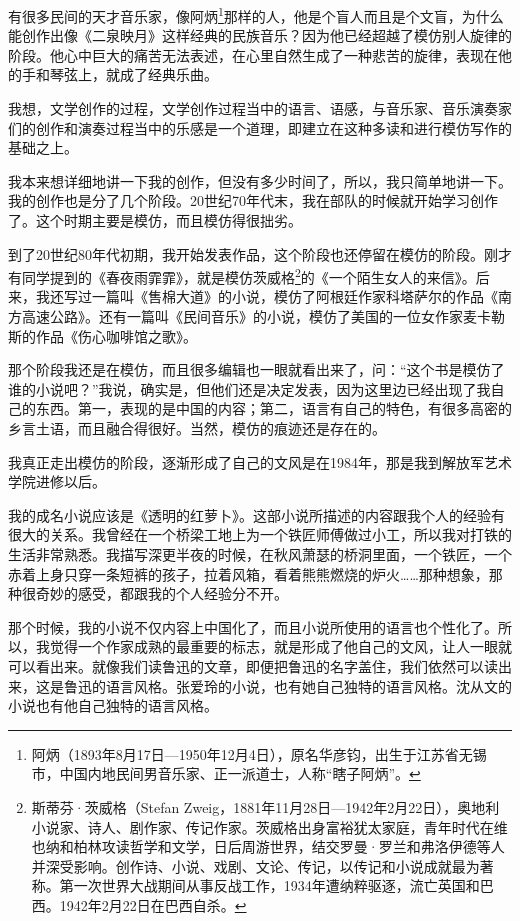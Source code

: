 \documentclass[fontset=fandol,12pt,a5paper]{ctexbook}
\begin{document}
有很多民间的天才音乐家，像阿炳\footnote{阿炳（1893年8月17日—1950年12月4日），原名华彦钧，出生于江苏省无锡市，中国内地民间男音乐家、正一派道士，人称“瞎子阿炳”。}那样的人，他是个盲人而且是个文盲，为什么能创作出像《二泉映月》这样经典的民族音乐？因为他已经超越了模仿别人旋律的阶段。他心中巨大的痛苦无法表述，在心里自然生成了一种悲苦的旋律，表现在他的手和琴弦上，就成了经典乐曲。

我想，文学创作的过程，文学创作过程当中的语言、语感，与音乐家、音乐演奏家们的创作和演奏过程当中的乐感是一个道理，即建立在这种多读和进行模仿写作的基础之上。

我本来想详细地讲一下我的创作，但没有多少时间了，所以，我只简单地讲一下。我的创作也是分了几个阶段。20世纪70年代末，我在部队的时候就开始学习创作了。这个时期主要是模仿，而且模仿得很拙劣。

到了20世纪80年代初期，我开始发表作品，这个阶段也还停留在模仿的阶段。刚才有同学提到的《春夜雨霏霏》，就是模仿茨威格\footnote{斯蒂芬·茨威格（Stefan Zweig，1881年11月28日—1942年2月22日），奥地利小说家、诗人、剧作家、传记作家。茨威格出身富裕犹太家庭，青年时代在维也纳和柏林攻读哲学和文学，日后周游世界，结交罗曼·罗兰和弗洛伊德等人并深受影响。创作诗、小说、戏剧、文论、传记，以传记和小说成就最为著称。第一次世界大战期间从事反战工作，1934年遭纳粹驱逐，流亡英国和巴西。1942年2月22日在巴西自杀。}的《一个陌生女人的来信》。后来，我还写过一篇叫《售棉大道》的小说，模仿了阿根廷作家科塔萨尔的作品《南方高速公路》。还有一篇叫《民间音乐》的小说，模仿了美国的一位女作家麦卡勒斯的作品《伤心咖啡馆之歌》。

那个阶段我还是在模仿，而且很多编辑也一眼就看出来了，问：“这个书是模仿了谁的小说吧？”我说，确实是，但他们还是决定发表，因为这里边已经出现了我自己的东西。第一，表现的是中国的内容；第二，语言有自己的特色，有很多高密的乡言土语，而且融合得很好。当然，模仿的痕迹还是存在的。

我真正走出模仿的阶段，逐渐形成了自己的文风是在1984年，那是我到解放军艺术学院进修以后。

我的成名小说应该是《透明的红萝卜》。这部小说所描述的内容跟我个人的经验有很大的关系。我曾经在一个桥梁工地上为一个铁匠师傅做过小工，所以我对打铁的生活非常熟悉。我描写深更半夜的时候，在秋风萧瑟的桥洞里面，一个铁匠，一个赤着上身只穿一条短裤的孩子，拉着风箱，看着熊熊燃烧的炉火……那种想象，那种很奇妙的感受，都跟我的个人经验分不开。


那个时候，我的小说不仅内容上中国化了，而且小说所使用的语言也个性化了。所以，我觉得一个作家成熟的最重要的标志，就是形成了他自己的文风，让人一眼就可以看出来。就像我们读鲁迅的文章，即便把鲁迅的名字盖住，我们依然可以读出来，这是鲁迅的语言风格。张爱玲的小说，也有她自己独特的语言风格。沈从文的小说也有他自己独特的语言风格。
\end{document}
